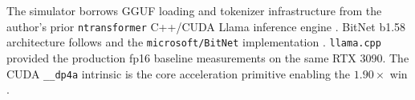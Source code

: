 \documentclass{article}
\begin{document}
The simulator borrows {GGUF} loading and tokenizer infrastructure from
the author's prior \texttt{ntransformer} {C++}/{CUDA} Llama inference
engine \citep{ntransformer-cortes}. BitNet b1.58 architecture
follows \citep{bitnet158-2024} and the \texttt{microsoft/BitNet}
implementation \citep{microsoft-bitnet-cpp}. \texttt{llama.cpp}
\citep{llamacpp} provided the production fp16 baseline measurements
on the same {RTX 3090}. The {CUDA} \texttt{\_\_dp4a} intrinsic is the
core acceleration primitive enabling the $1.90\times$ win
\citep{cuda-dp4a, nvidia-ampere-arch}.



\end{document}
